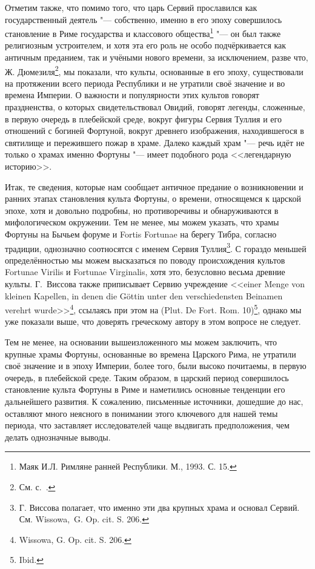 Отметим также, что помимо того, что царь Сервий прославился как государственный деятель "--- собственно, именно в его эпоху совершилось становление в Риме государства и классового общества\footnote{Маяк И.Л. Римляне ранней Республики. М., 1993. С. 15.} "--- он был также религиозным устроителем, и хотя эта его роль не особо подчёркивается как античным преданием, так и учёными нового времени, за исключением, разве что, Ж. Дюмезиля\footnote{См. с.~\pageref{DumezilFort}.}, мы показали, что культы, основанные в его эпоху, существовали на протяжении всего периода Республики и не утратили своё значение и во времена Империи. О важности и популярности этих культов говорят праздненства, о которых свидетельствовал Овидий, говорят легенды, сложенные, в первую очередь в плебейской среде, вокруг фигуры Сервия Туллия и его отношений с богиней Фортуной, вокруг древнего изображения, находившегося в святилище и пережившего пожар в храме. Далеко каждый храм "--- речь идёт не только о храмах именно Фортуны "--- имеет подобного рода <<легендарную историю>>.

Итак, те сведения, которые нам сообщает античное предание о возникновении и ранних этапах становления культа Фортуны, о времени, относящемся к царской эпохе, хотя и довольно подробны, но противоречивы и обнаруживаются в мифологическом окружении. Тем не менее, мы можем указать, что храмы Фортуны на Бычьем форуме и Fortis Fortunae на берегу Тибра, согласно традиции, однозначно соотносятся с именем Сервия Туллия\footnote{Г. Виссова полагает, что именно эти два крупных храма и основал Сервий. См. Wissowa,~G. Op. cit. S. 206.}. С гораздо меньшей определённостью мы можем высказаться по поводу происхождения культов Fortunae Virilis и Fortunae Virginalis, хотя это, безусловно весьма древние культы. Г.~Виссова также приписывает Сервию учреждение <<einer Menge von kleinen Kapellen, in denen die G\"{o}ttin unter den verschiedensten Beinamen verehrt wurde>>\footnote{Wissowa, G. Op. cit. S. 206.}, ссылаясь при этом на (Plut. De Fort. Rom. 10)\footnote{Ibid.}, однако мы уже показали выше, что доверять греческому автору в этом вопросе не следует.

Тем не менее, на основании вышеизложенного мы можем заключить, что крупные храмы Фортуны, основанные во времена Царского Рима, не утратили своё значение и в эпоху Империи, более того, были высоко почитаемы, в первую очередь, в плебейской среде. Таким образом, в царский период совершилось становление культа Фортуны в Риме и наметились основные тенденции его дальнейшего развития. К сожалению, письменные источники, дошедшие до нас, оставляют много неясного в понимании этого ключевого для нашей темы периода, что заставляет исследователей чаще выдвигать предположения, чем делать однозначные выводы.


